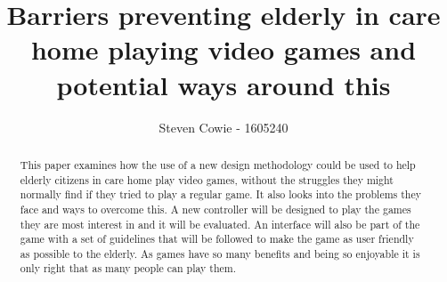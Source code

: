 \documentclass[journal]{IEEEtran}
\begin{document}
%
\title{Barriers preventing elderly in care home playing video games and potential ways around this}
%
%
\author{Steven Cowie - 1605240 }


\maketitle

\begin{abstract}
This paper examines how the use of a new design methodology could be used to help elderly citizens in care home play video games, without the struggles they might normally find if they tried to play a regular game. It also looks into the problems they face and ways to overcome this. A new controller will be designed to play the games they are most interest in and it will be evaluated. An interface will also be part of the game with a set of guidelines that will be followed to make the game as user friendly as possible to the elderly. As games have so many benefits and being so enjoyable it is only right that as many people can play them.
\end{abstract}
\end{document}
